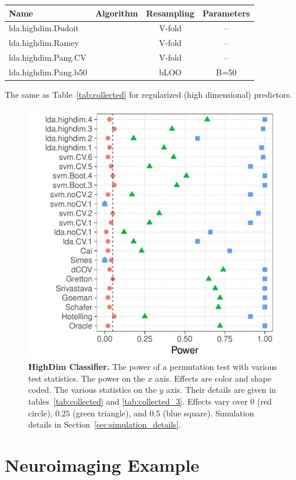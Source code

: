 \documentclass[journal]{IEEEtran}
\begin{document}
\begin{tcolorbox}
	\centering
	\tiny
	\begin{tabular}{l|c|c|c}
		Name & Algorithm & Resampling &  Parameters\\ 
		\hline
		\hline
		lda.highdim.Dudoit & \cite{dudoit_comparison_2002} & V-fold & -- \\ 
		lda.highdim.Ramey & \cite{ramey_high-dimensional_2016} & V-fold & -- \\ 
		lda.highdim.Pang.CV & \cite{pang_shrinkage-based_2009} & V-fold & -- \\ 
		lda.highdim.Pang.b50 & \cite{pang_shrinkage-based_2009} & bLOO 	 & B=50 \\ 
	\end{tabular} 
	\captionsetup{type=table}
	\caption{\footnotesize
		The same as Table~\ref{tab:collected} for regularized (high dimensional) predictors. 
	} 
	\label{tab:collected_3}
\end{tcolorbox}


\begin{figure}[ht]
	\centering
	\includegraphics[width=0.5\columnwidth]{"art/file14"}
	\caption{
		\textbf{HighDim Classifier.} 
		The power of a permutation test with various test statistics. 
		The power on the $x$ axis. 
		Effects are color and shape coded. 
		The various statistics on the $y$ axis. 
		Their details are given in tables~\ref{tab:collected} and \ref{tab:collected_3}. 
		Effects vary over $0$ (red circle), $0.25$ (green triangle), and $0.5$ (blue square). 
		Simulation details in Section~\ref{sec:simulation_details}.
	} 
	\label{fig:highdim}
\end{figure}








\section{Neuroimaging Example}
\label{sec:example}
\end{document}
